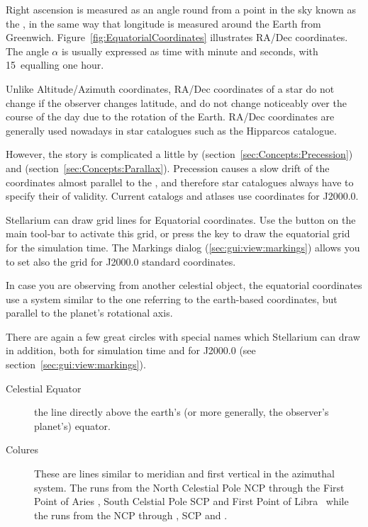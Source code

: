 Right ascension is measured as an angle round from a point in the sky
known as the , in the same way that
longitude is measured around the Earth from
Greenwich. Figure~\ref{fig:EquatorialCoordinates} illustrates RA/Dec
coordinates. The angle $\alpha$ is usually expressed as time with
minute and seconds, with 15\degree\ equalling one hour.

Unlike Altitude/Azimuth coordinates, RA/Dec coordinates of a star do
not change if the observer changes latitude, and do not change
noticeably over the course of the day due to the rotation of the
Earth.  RA/Dec coordinates are generally used nowadays in star
catalogues such as the Hipparcos catalogue.


However, the story is complicated a little by 
(section~\ref{sec:Concepts:Precession}) and 
(section~\ref{sec:Concepts:Parallax}). Precession causes a slow drift
of the coordinates almost parallel to the , and therefore star
catalogues always have to specify their  of
validity. Current catalogs and atlases use coordinates for J2000.0.


Stellarium can draw grid lines for Equatorial coordinates. Use the
button  on the main tool-bar to activate
this grid, or press the  key to draw the equatorial grid for
the simulation time. The Markings dialog (\ref{sec:gui:view:markings})
allows you to set also the grid for J2000.0 standard coordinates.

In case you are observing from another celestial object, the
equatorial coordinates use a system similar to the one referring to
the earth-based coordinates, but parallel to the planet's rotational
axis.

There are again a few great circles with special names which
Stellarium can draw in addition, both for simulation time and for
J2000.0 (see section~\ref{sec:gui:view:markings}).
\begin{description}
\item[Celestial Equator] the line directly above the earth's (or more
  generally, the observer's planet's) equator.
\item[Colures] These are lines similar to meridian and first vertical
  in the azimuthal system. The  runs from the
  North Celestial Pole NCP through the First Point of Aries \Aries,
  South Celstial Pole SCP and First Point of Libra \Libra\, while the
   runs from the NCP through  \Cancer, SCP and  \Capricorn.
\end{description}

